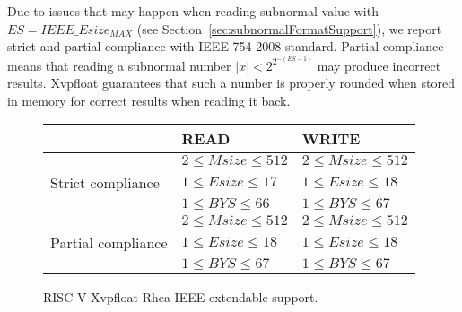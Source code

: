 Due to issues that may happen when reading subnormal value with $ES = IEEE\_Esize_{MAX}$ (see Section~\ref{sec:subnormalFormatSupport}), we report strict and partial compliance with IEEE-754 2008 standard.
Partial compliance means that reading a subnormal number $ |x| < 2^{2^{-(ES-1)}}$ may produce incorrect results.
Xvpfloat guarantees that such a number is properly rounded when stored in memory for correct results when reading it back.

\begin{figure}[ht]
\begin{center}
    \begin{tabular}{|l|l|l|}
    \hline
                        & READ                    & WRITE \\
    \hline
                        & $2 \leq Msize \leq 512$ & $2 \leq Msize \leq 512$ \\
    \cline{2-3}
    Strict compliance   & $1 \leq Esize \leq 17$  & $1 \leq Esize \leq 18$  \\
    \cline{2-3}
                        & $1 \leq BYS \leq 66$    & $1 \leq BYS \leq 67$    \\
    \hline
                        & $2 \leq Msize \leq 512$ & $2 \leq Msize \leq 512$ \\
    \cline{2-3}
    Partial compliance  & $1 \leq Esize \leq 18$  & $1 \leq Esize \leq 18$  \\
    \cline{2-3}
                        & $1 \leq BYS \leq 67$    & $1 \leq BYS \leq 67$    \\
    \hline
    \end{tabular}
\end{center}
\caption{RISC-V Xvpfloat Rhea IEEE extendable support.}
\label{fig:Xvpfloat_rhea_ieee_extendable}
\end{figure}

